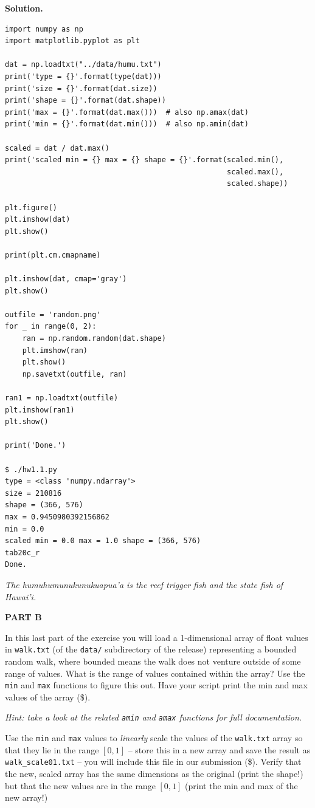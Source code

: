 \documentclass[10pt]{article}
\begin{document}
\begin{enumerate}
\begin{figure}
\end{figure}

{\bf Solution.}

\begin{verbatim}
import numpy as np
import matplotlib.pyplot as plt

dat = np.loadtxt("../data/humu.txt")
print('type = {}'.format(type(dat)))
print('size = {}'.format(dat.size))
print('shape = {}'.format(dat.shape))
print('max = {}'.format(dat.max()))  # also np.amax(dat)
print('min = {}'.format(dat.min()))  # also np.amin(dat)

scaled = dat / dat.max()
print('scaled min = {} max = {} shape = {}'.format(scaled.min(),
                                                   scaled.max(),
                                                   scaled.shape))

plt.figure()
plt.imshow(dat)
plt.show()

print(plt.cm.cmapname)

plt.imshow(dat, cmap='gray')
plt.show()

outfile = 'random.png'
for _ in range(0, 2):
    ran = np.random.random(dat.shape)
    plt.imshow(ran)
    plt.show()
    np.savetxt(outfile, ran)

ran1 = np.loadtxt(outfile)
plt.imshow(ran1)
plt.show()

print('Done.')

$ ./hw1.1.py
type = <class 'numpy.ndarray'>
size = 210816
shape = (366, 576)
max = 0.9450980392156862
min = 0.0
scaled min = 0.0 max = 1.0 shape = (366, 576)
tab20c_r
Done.

\end{verbatim}

\emph{The humuhumunukunukuapua’a is the reef trigger fish and the state fish of Hawai'i.}

\textbf{PART B}

In this last part of the exercise you will load a 1-dimensional array of float values in {\tt walk.txt} (of the {\tt data/} subdirectory of the release) representing a bounded random walk, where bounded means the walk does not venture outside of some range of values.  What is the range of values contained within the array?  Use the {\tt min} and {\tt max} functions to figure this out.  Have your script print the min and max values of the array (\$).

{\em Hint: take a look at the related {\tt amin} and {\tt amax} functions for full documentation.}

Use the {\tt min} and {\tt max} values to {\em linearly} scale the values of the {\tt walk.txt} array so that they lie in the range $[0, 1]$ -- store this in a new array and save the result as {\tt walk\_scale01.txt} -- you will include this file in our submission (\$).  Verify that the new, scaled array has the same dimensions as the original (print the shape!) but that the new values are in the range $[0, 1]$ (print the min and max of the new array!) 


\end{enumerate}
\end{document}
